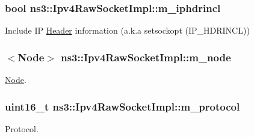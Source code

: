 \subsubsection[{\texorpdfstring{m\+\_\+iphdrincl}{m_iphdrincl}}]{\setlength{\rightskip}{0pt plus 5cm}bool ns3\+::\+Ipv4\+Raw\+Socket\+Impl\+::m\+\_\+iphdrincl\hspace{0.3cm}{\ttfamily [private]}}\hypertarget{classns3_1_1Ipv4RawSocketImpl_a895d0929c6fb2c111f99e83a8b7516fc}{}\label{classns3_1_1Ipv4RawSocketImpl_a895d0929c6fb2c111f99e83a8b7516fc}


Include IP \hyperlink{classns3_1_1Header}{Header} information (a.\+k.\+a setsockopt (I\+P\+\_\+\+H\+D\+R\+I\+N\+CL)) 

\subsubsection[{\texorpdfstring{m\+\_\+node}{m_node}}]{$<${\bf Node}$>$ ns3\+::\+Ipv4\+Raw\+Socket\+Impl\+::m\+\_\+node\hspace{0.3cm}{\ttfamily [private]}}\hypertarget{classns3_1_1Ipv4RawSocketImpl_af8cdf6f27af43b69c0616b90e9f3af98}{}\label{classns3_1_1Ipv4RawSocketImpl_af8cdf6f27af43b69c0616b90e9f3af98}


\hyperlink{classns3_1_1Node}{Node}. 

\subsubsection[{\texorpdfstring{m\+\_\+protocol}{m_protocol}}]{\setlength{\rightskip}{0pt plus 5cm}uint16\+\_\+t ns3\+::\+Ipv4\+Raw\+Socket\+Impl\+::m\+\_\+protocol\hspace{0.3cm}{\ttfamily [private]}}\hypertarget{classns3_1_1Ipv4RawSocketImpl_a924effb0eb9a6cbbf1daeb3a7b7ffc94}{}\label{classns3_1_1Ipv4RawSocketImpl_a924effb0eb9a6cbbf1daeb3a7b7ffc94}


Protocol. 

